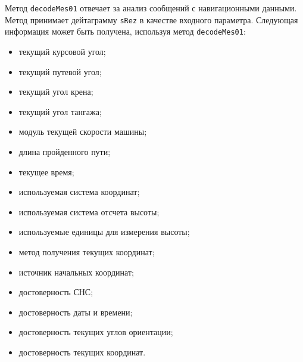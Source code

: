 \begin{enum}
	\item Метод \texttt{decodeMes01} отвечает за анализ сообщений с навигационными данными. Метод принимает
		дейтаграмму \texttt{sRez} в качестве входного параметра.
		Следующая информация может быть получена, используя метод
		\texttt{decodeMes01}:
		\begin{itemize}
			\item текущий курсовой угол;
			\item текущий путевой угол;
			\item текущий угол крена;
			\item текущий угол тангажа;
			\item модуль текущей скорости машины;
			\item длина пройденного пути;
			\item текущее время;
			\item используемая система координат;
			\item используемая система отсчета высоты;
			\item используемые единицы для измерения высоты;
			\item метод получения текущих координат;
			\item источник начальных координат;
			\item достоверность СНС;
			\item достоверность даты и времени;
			\item достоверность текущих углов ориентации;
			\item достоверность текущих координат.
		\end{itemize}


\end{enum}
